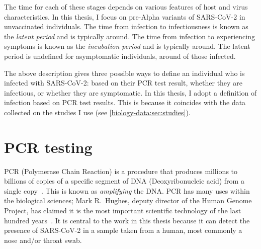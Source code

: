 \documentclass[thesis.tex]{subfiles}
\begin{document}
The time for each of these stages depends on various features of host and virus characteristics.
In this thesis, I focus on pre-Alpha variants of SARS-CoV-2 in unvaccinated individuals.
The time from infection to infectiousness is known as the \emph{latent period} and is typically around.
The time from infection to experiencing symptoms is known as the \emph{incubation period} and is typically around.
The latent period is undefined for asymptomatic individuals, around of those infected.

The above description gives three possible ways to define an individual who is infected with SARS-CoV-2: based on their PCR test result, whether they are infectious, or whether they are symptomatic.
In this thesis, I adopt a definition of infection based on PCR test results.
This is because it coincides with the data collected on the studies I use (see \cref{biology-data:sec:studies}).



\section{PCR testing} \label{biology-data:sec:PCR}


PCR (Polymerase Chain Reaction) is a procedure that produces millions to billions of copies of a specific segment of DNA (Deoxyribonucleic acid) from a single copy~\autocites{smithPCR}{garibyanPCR}.
This is known as \emph{amplifying} the DNA.
PCR has many uses within the biological sciences; Mark R.\ Hughes, deputy director of the Human Genome Project, has claimed it is the most important scientific technology of the last hundred years~\autocite{powledgePCR}.
It is central to the work in this thesis because it can detect the presence of SARS-CoV-2 in a sample taken from a human, most commonly a nose and/or throat swab.
\end{document}
